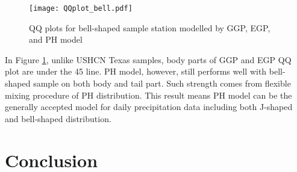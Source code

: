 \documentclass[12pt]{article}\usepackage[]{graphicx}\usepackage[]{color}
\begin{document}
\begin{figure}
  \centering
  \texttt{[image: QQplot\_bell.pdf]}
  \caption{QQ plots for bell-shaped sample station modelled by GGP, EGP, and PH model}
  \label{fig:qq_bell}
\end{figure}


In Figure \ref{fig:qq_bell}, unlike USHCN Texas samples, body parts of GGP and EGP QQ plot are under the 45 \degree line. PH model, however, still performs well with bell-shaped sample on both body and tail part. Such strength comes from flexible mixing procedure of PH distribution. This result means PH model can be the generally accepted model for daily precipitation data including both J-shaped and bell-shaped distribution. 


\section{Conclusion}










\end{document}
